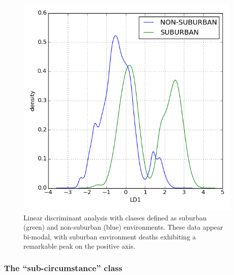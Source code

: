 \begin{multicols}{2}
\begin{figure}[H]
  \centering
    \includegraphics[width=\linewidth]{images/suburban/suburban.png}
  \caption{Linear discriminant analysis with classes defined as suburban (green) and non-suburban (blue) environments.  These data appear bi-modal, with suburban environment deaths exhibiting a remarkable peak on the positive axis.}
\end{figure}

\end{multicols}

\subsubsection{The ``sub-circumstance'' class}

